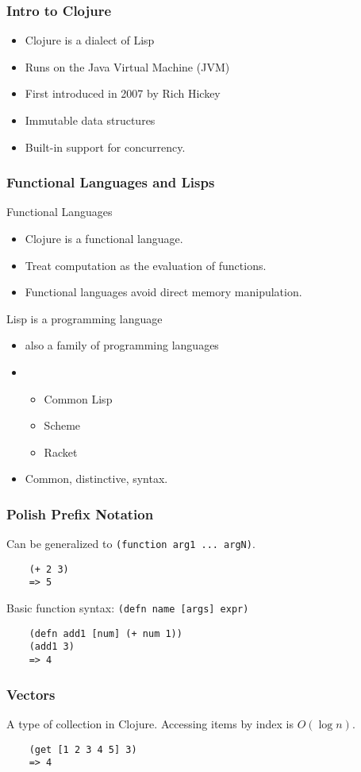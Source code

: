 \documentclass{beamer}
\newcommand{\clocode}[1]{{\texttt {#1}}}
\begin{document}
\begin{frame}[fragile]
\frametitle{Intro to Clojure}
	\begin{itemize}
  	 \item Clojure is a dialect of Lisp
	 \item Runs on the Java Virtual Machine (JVM)
  	 \item First introduced in 2007 by Rich Hickey
  	 \item Immutable data structures
	 \item Built-in support for concurrency.
	 \end{itemize}
\end{frame}
\begin{frame}[fragile]
\frametitle{Functional Languages and Lisps}
	Functional Languages
	\begin{itemize}
	 \item Clojure is a functional language.
  	 \item Treat computation as the evaluation of functions.
  	 \item Functional languages avoid direct memory manipulation.
       \end{itemize}
	Lisp is a programming language
	\begin{itemize}
	\item also a family of programming languages
	\item \begin{itemize}
		 \item Common Lisp
		 \item Scheme
		 \item Racket
		\end{itemize}
	\item Common, distinctive, syntax.
	\end{itemize}
\end{frame}
\begin{frame}[fragile]
\frametitle{Polish Prefix Notation}
Can be generalized to \clocode{(function arg1 ... argN)}.
	\begin{verbatim}
	(+ 2 3)
	=> 5
	\end{verbatim}
Basic function syntax: \clocode{(defn name [args] expr)}
	\begin{verbatim}
	(defn add1 [num] (+ num 1))
	(add1 3)
	=> 4
	\end{verbatim}
\end{frame}
\begin{frame}[fragile]
\frametitle{Vectors}

A type of collection in Clojure.
Accessing items by index is $O(\log n)$.
	\begin{verbatim}
	(get [1 2 3 4 5] 3)	
	=> 4
	\end{verbatim}
\end{frame}
\end{document}

